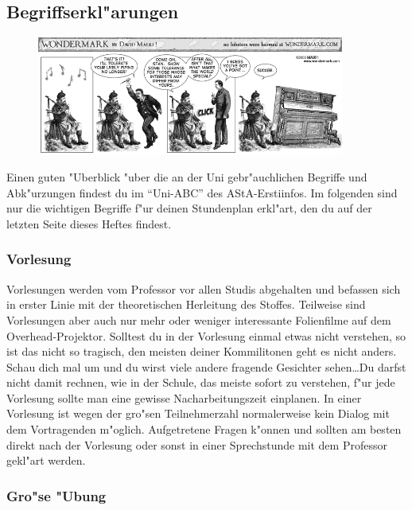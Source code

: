 \subsection{Begriffserkl"arungen}

\begin{figure}[b]
	\centering\includegraphics[width=0.9\textwidth]{bilder/comics/wondermark003.png}
\end{figure}

Einen guten "Uberblick "uber die an der Uni gebr"auchlichen Begriffe und
Abk"urzungen findest du im "`Uni-ABC"' des AStA-Erstiinfos. Im folgenden
sind nur die wichtigen Begriffe f"ur deinen Stundenplan erkl"art, den du
auf der letzten Seite dieses Heftes findest.


\subsubsection*{Vorlesung}

Vorlesungen werden vom Professor vor allen Studis abgehalten und befassen
sich in erster Linie mit der theoretischen Herleitung des Stoffes. Teilweise
sind Vorlesungen aber auch nur mehr oder weniger interessante Folienfilme auf
dem Overhead-Projektor. Solltest du in der Vorlesung einmal etwas nicht
verstehen, so ist das nicht so tragisch, den meisten deiner Kommilitonen geht
es nicht anders. Schau dich mal um und du wirst viele andere fragende Gesichter
sehen\ldots Du darfst nicht damit rechnen, wie in der Schule, das meiste sofort zu
verstehen, f"ur jede Vorlesung sollte man eine gewisse Nacharbeitungszeit
einplanen. In einer Vorlesung ist wegen der gro"sen Teilnehmerzahl
normalerweise kein Dialog mit dem Vortragenden m"oglich. Aufgetretene Fragen
k"onnen und sollten am besten direkt nach der Vorlesung oder sonst in einer
Sprechstunde mit dem Professor gekl"art werden.


\subsubsection*{Gro"se "Ubung}

